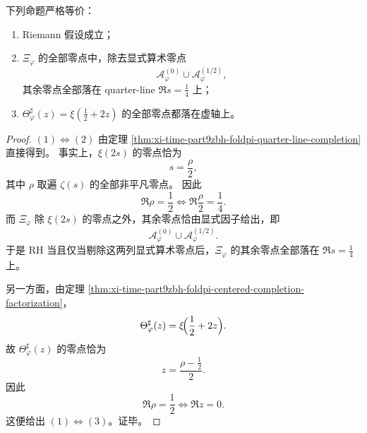 \begin{theorem}\label{thm:xi-time-part9zbh-foldpi-rh-quarter-line-equivalence}
下列命题严格等价：
\begin{enumerate}
  \item Riemann 假设成立；
  \item \(\Xi_\varphi\) 的全部零点中，除去显式算术零点
  \[
  \mathcal A_\varphi^{(0)}\cup \mathcal A_\varphi^{(1/2)},
  \]
  其余零点全部落在 quarter-line \(\Re s=\frac14\) 上；
  \item \(\Theta_\varphi^\sharp(z)=\xi(\frac12+2z)\) 的全部零点都落在虚轴上。
\end{enumerate}
\end{theorem}
\begin{proof}
\((1)\Leftrightarrow(2)\) 由定理 \ref{thm:xi-time-part9zbh-foldpi-quarter-line-completion} 直接得到。
事实上，\(\xi(2s)\) 的零点恰为
\[
s=\frac{\rho}{2},
\]
其中 \(\rho\) 取遍 \(\zeta(s)\) 的全部非平凡零点。
因此
\[
\Re \rho=\frac12
\iff
\Re \frac{\rho}{2}=\frac14.
\]
而 \(\Xi_\varphi\) 除 \(\xi(2s)\) 的零点之外，其余零点恰由显式因子给出，即
\[
\mathcal A_\varphi^{(0)}\cup \mathcal A_\varphi^{(1/2)}.
\]
于是 RH 当且仅当剔除这两列显式算术零点后，\(\Xi_\varphi\) 的其余零点全部落在 \(\Re s=\frac14\) 上。

另一方面，由定理 \ref{thm:xi-time-part9zbh-foldpi-centered-completion-factorization}，
\[
\Theta_\varphi^\sharp(z)=\xi\!\Bigl(\frac12+2z\Bigr).
\]
故 \(\Theta_\varphi^\sharp(z)\) 的零点恰为
\[
z=\frac{\rho-\frac12}{2}.
\]
因此
\[
\Re \rho=\frac12
\iff
\Re z=0.
\]
这便给出 \((1)\Leftrightarrow(3)\)。证毕。
\end{proof}

